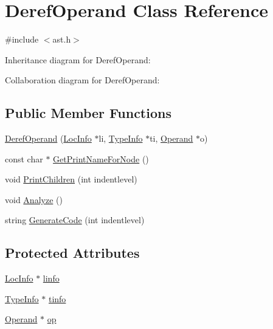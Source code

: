 \hypertarget{class_deref_operand}{}\section{Deref\+Operand Class Reference}
\label{class_deref_operand}


{\ttfamily \#include $<$ast.\+h$>$}



Inheritance diagram for Deref\+Operand\+:


Collaboration diagram for Deref\+Operand\+:
\subsection*{Public Member Functions}
\begin{DoxyCompactItemize}
\item 
\hyperlink{class_deref_operand_af0a072f28236d850fc6ea45a488fa599}{Deref\+Operand} (\hyperlink{class_loc_info}{Loc\+Info} $\ast$li, \hyperlink{class_type_info}{Type\+Info} $\ast$ti, \hyperlink{class_operand}{Operand} $\ast$o)
\item 
const char $\ast$ \hyperlink{class_deref_operand_a6cfdfb30a00cc2b0b76cdb511e780411}{Get\+Print\+Name\+For\+Node} ()
\item 
void \hyperlink{class_deref_operand_a64fc44093f59b87172b8a04752a13d45}{Print\+Children} (int indentlevel)
\item 
void \hyperlink{class_deref_operand_a970e6fbc520f6e9f2aee97a306fa1eae}{Analyze} ()
\item 
string \hyperlink{class_deref_operand_a67a9b76b4e9cc9085c03ccf8ed098aff}{Generate\+Code} (int indentlevel)
\end{DoxyCompactItemize}
\subsection*{Protected Attributes}
\begin{DoxyCompactItemize}
\item 
\hyperlink{class_loc_info}{Loc\+Info} $\ast$ \hyperlink{class_deref_operand_a62b18da9e27d9d1bda7810debb45fc66}{linfo}
\item 
\hyperlink{class_type_info}{Type\+Info} $\ast$ \hyperlink{class_deref_operand_a8ed3dec1ff7eef19af757a6826878f5e}{tinfo}
\item 
\hyperlink{class_operand}{Operand} $\ast$ \hyperlink{class_deref_operand_a5999f70ee683b69541a312893d177fd8}{op}
\end{DoxyCompactItemize}


